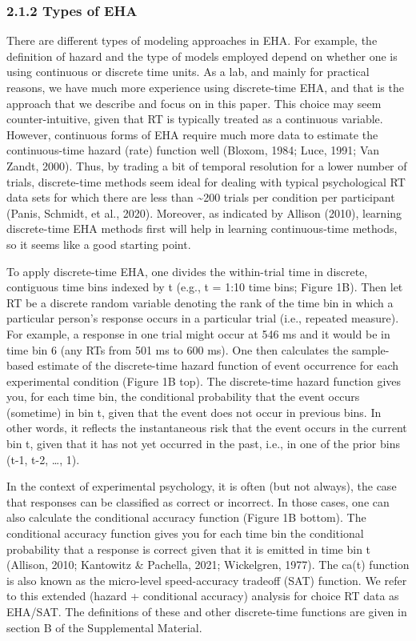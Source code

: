 \documentclass[
  man, donotrepeattitle,floatsintext]{apa6}
\begin{document}
\subsubsection{2.1.2 Types of EHA}\label{types-of-eha}

There are different types of modeling approaches in EHA.
For example, the definition of hazard and the type of models employed depend on whether one is using continuous or discrete time units.
As a lab, and mainly for practical reasons, we have much more experience using discrete-time EHA, and that is the approach that we describe and focus on in this paper.
This choice may seem counter-intuitive, given that RT is typically treated as a continuous variable.
However, continuous forms of EHA require much more data to estimate the continuous-time hazard (rate) function well (Bloxom, 1984; Luce, 1991; Van Zandt, 2000).
Thus, by trading a bit of temporal resolution for a lower number of trials, discrete-time methods seem ideal for dealing with typical psychological RT data sets for which there are less than \textasciitilde200 trials per condition per participant (Panis, Schmidt, et al., 2020).
Moreover, as indicated by Allison (2010), learning discrete-time EHA methods first will help in learning continuous-time methods, so it seems like a good starting point.

To apply discrete-time EHA, one divides the within-trial time in discrete, contiguous time bins indexed by t (e.g., t = 1:10 time bins; Figure 1B).
Then let RT be a discrete random variable denoting the rank of the time bin in which a particular person's response occurs in a particular trial (i.e., repeated measure).
For example, a response in one trial might occur at 546 ms and it would be in time bin 6 (any RTs from 501 ms to 600 ms).
One then calculates the sample-based estimate of the discrete-time hazard function of event occurrence for each experimental condition (Figure 1B top).
The discrete-time hazard function gives you, for each time bin, the conditional probability that the event occurs (sometime) in
bin t, given that the event does not occur in previous bins.
In other words, it reflects the instantaneous risk that the event occurs in the current bin t, given that it has not yet
occurred in the past, i.e., in one of the prior bins (t-1, t-2, \ldots, 1).

In the context of experimental psychology, it is often (but not always), the case that responses can be classified as correct or incorrect.
In those cases, one can also calculate the conditional accuracy function (Figure 1B bottom).
The conditional accuracy function gives you for each time bin the conditional probability that a response is correct given that it is emitted in time bin t (Allison, 2010; Kantowitz \& Pachella, 2021; Wickelgren, 1977).
The ca(t) function is also known as the micro-level speed-accuracy tradeoff (SAT) function.
We refer to this extended (hazard + conditional accuracy) analysis for choice RT data as EHA/SAT. The definitions of these and other discrete-time functions are given in section B of the Supplemental Material.
\end{document}

